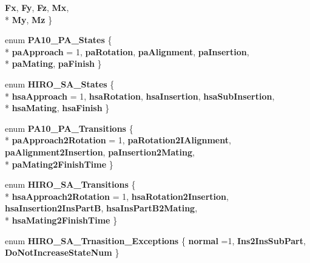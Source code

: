 \begin{DoxyCompactItemize}
{\bfseries Fx}, 
{\bfseries Fy}, 
{\bfseries Fz}, 
{\bfseries Mx}, 
\\*
{\bfseries My}, 
{\bfseries Mz}
 \}
\item 
enum {\bfseries P\-A10\-\_\-\-P\-A\-\_\-\-States} \{ \\*
{\bfseries pa\-Approach} = 1, 
{\bfseries pa\-Rotation}, 
{\bfseries pa\-Alignment}, 
{\bfseries pa\-Insertion}, 
\\*
{\bfseries pa\-Mating}, 
{\bfseries pa\-Finish}
 \}
\item 
enum {\bfseries H\-I\-R\-O\-\_\-\-S\-A\-\_\-\-States} \{ \\*
{\bfseries hsa\-Approach} = 1, 
{\bfseries hsa\-Rotation}, 
{\bfseries hsa\-Insertion}, 
{\bfseries hsa\-Sub\-Insertion}, 
\\*
{\bfseries hsa\-Mating}, 
{\bfseries hsa\-Finish}
 \}
\item 
enum {\bfseries P\-A10\-\_\-\-P\-A\-\_\-\-Transitions} \{ \\*
{\bfseries pa\-Approach2\-Rotation} = 1, 
{\bfseries pa\-Rotation2\-I\-Alignment}, 
{\bfseries pa\-Alignment2\-Insertion}, 
{\bfseries pa\-Insertion2\-Mating}, 
\\*
{\bfseries pa\-Mating2\-Finish\-Time}
 \}
\item 
enum {\bfseries H\-I\-R\-O\-\_\-\-S\-A\-\_\-\-Transitions} \{ \\*
{\bfseries hsa\-Approach2\-Rotation} = 1, 
{\bfseries hsa\-Rotation2\-Insertion}, 
{\bfseries hsa\-Insertion2\-Ins\-Part\-B}, 
{\bfseries hsa\-Ins\-Part\-B2\-Mating}, 
\\*
{\bfseries hsa\-Mating2\-Finish\-Time}
 \}
\item 
enum {\bfseries H\-I\-R\-O\-\_\-\-S\-A\-\_\-\-Trnasition\-\_\-\-Exceptions} \{ {\bfseries normal} =1, 
{\bfseries Ins2\-Ins\-Sub\-Part}, 
{\bfseries Do\-Not\-Increase\-State\-Num}
 \}
\end{DoxyCompactItemize}
